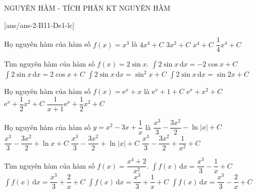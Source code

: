 \begin{name}
	{NGUYÊN HÀM - TÍCH PHÂN}
	{KT NGUYÊN HÀM}
	{\tentruong}
	{\thoigian}
\end{name}
\setcounter{ex}{0}\setcounter{bt}{0}
[ans/ans-2-B11-De1-lc]
\TN
\begin{ex}%
	Họ nguyên hàm của hàm số $f(x)=x^3$ là
	\choice
	{$4x^4+C$}
	{$3x^2+C$}
	{$x^4+C$}
	{\True $\dfrac{1}{4}x^4+C$}
\end{ex}

\begin{ex}%
	Tìm nguyên hàm của hàm số $ f(x)=2\sin x$.
	\choice
	{\True $\displaystyle\int 2\sin x\mathrm{\,d}x=-2\cos x+C$}
	{$\displaystyle\int 2\sin x\mathrm{\,d}x=2\cos x+C$}
	{$\displaystyle\int 2\sin x\mathrm{\,d}x=\sin^2x+C$}
	{$\displaystyle\int 2\sin x\mathrm{\,d}x=\sin 2x+C$}
\end{ex}

\begin{ex}%
	Họ nguyên hàm của hàm số $f(x)=\mathrm{e}^x+x$ là
	\choice
	{$\mathrm{e}^x+1+C$}
	{$\mathrm{e}^x+x^2+C$}
	{\True $\mathrm{e}^x+\dfrac{1}{2}{x^2}+C$}
	{$\dfrac{1}{x+1}{\mathrm{e}^x}+\dfrac{1}{2}{x^2}+C$}
\end{ex}

\begin{ex}%
	Họ nguyên hàm của hàm số $y=x^2-3x+\dfrac{1}{x}$ là
	\choice
	{$\dfrac{x^3}{3}-\dfrac{3x^2}{2}-\ln\left|x\right|+C$}
	{$\dfrac{x^3}{3}-\dfrac{3x^2}{2}+\ln x+C$}
	{\True $\dfrac{x^3}{3}-\dfrac{3x^2}{2}+\ln\left|x\right|+C$}
	{$\dfrac{x^3}{3}-\dfrac{3x^2}{2}+\dfrac{1}{x^2}+C$}
\end{ex}

\begin{ex}%
	Tìm nguyên hàm của hàm số $f(x)=\dfrac{x^4+2}{x^2}$.
	\choice
	{$\displaystyle\int f(x)\mathrm{\,d}x=\dfrac{x^3}{3}-\dfrac{1}{x}+C$}
	{$\displaystyle\int f(x)\mathrm{\,d}x=\dfrac{x^3}{3}+\dfrac{2}{x}+C$}
	{$\displaystyle\int f(x)\mathrm{\,d}x=\dfrac{x^3}{3}+\dfrac{1}{x}+C$}
	{\True $\displaystyle\int f(x)\mathrm{\,d}x=\dfrac{x^3}{3}-\dfrac{2}{x}+C$}
\end{ex}

